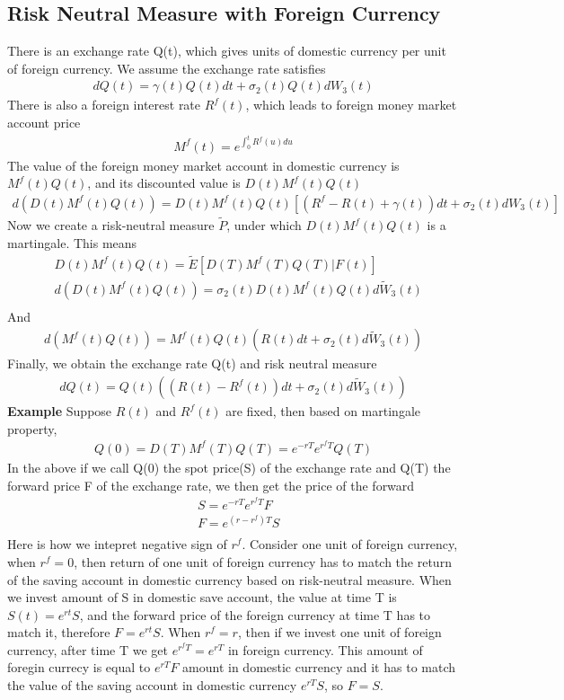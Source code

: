 \documentclass[a4paper]{article}
\begin{document}
\subsection{Risk Neutral Measure with Foreign Currency}
There is an exchange rate Q(t), which gives units of domestic currency per unit of foreign currency. We assume the exchange rate satisfies
\begin{align*}
	dQ(t) = \gamma(t)Q(t)dt + \sigma_2(t)Q(t)dW_3(t)
\end{align*}
There is also a foreign interest rate $R^f(t)$, which leads to foreign money market account price
\begin{align*}
	M^f(t) = e^{\int_0^t R^f(u) du}
\end{align*}
The value of the foreign money market account in domestic currency is $M^f(t)Q(t)$, and its discounted value is $D(t)M^f(t)Q(t)$
\begin{align*}
	d(D(t)M^f(t)Q(t)) = D(t)M^f(t)Q(t)[(R^f - R(t) + \gamma(t))dt + \sigma_2(t) dW_3(t)]
\end{align*}
Now we create a risk-neutral measure $\tilde P$, under which $D(t)M^f(t)Q(t)$ is a martingale. This means
\begin{align*}
	& D(t)M^f(t)Q(t) = \tilde E[D(T)M^f(T)Q(T)|F(t)] \\
	& d(D(t)M^f(t)Q(t)) = \sigma_2(t) D(t)M^f(t)Q(t)d\tilde W_3(t) \\
\end{align*}
And
\begin{align*}
	d(M^f(t)Q(t)) = M^f(t)Q(t)(R(t)dt + \sigma_2(t) d\tilde W_3(t))
\end{align*}
Finally, we obtain the exchange rate Q(t) and risk neutral measure
\begin{align*}
	dQ(t) = Q(t)((R(t) - R^f(t))dt + \sigma_2(t) d\tilde W_3(t))
\end{align*}
{\bf Example}
Suppose $R(t)$ and $R^f(t)$ are fixed, then based on martingale property, 
\begin{align*}
	Q(0) = D(T) M^f(T)Q(T) = e^{-rT} e^{r^fT}Q(T)
\end{align*}
In the above if we call Q(0) the spot price(S) of the exchange rate and Q(T) the forward price F of the exchange rate, we then get the price of the forward
\begin{align*}
	& S = e^{-rT} e^{r^fT}F \\
	& F = e^{(r - r^f)T}S \\
\end{align*}
Here is how we intepret negative sign of $r^f$. Consider one unit of foreign currency, when $r^f = 0$, then return of one unit of foreign currency has to match the return of the saving account in domestic currency based on risk-neutral measure. When we invest amount of S in domestic save account, the value at time T is $S(t) = e^{rt}S$, and the forward price of the foreign currency at time T has to match it, therefore $F = e^{rt} S$. When $r^f = r$, then if we invest one unit of foreign currency, after time T we get $e^{r^fT} = e^{rT}$ in foreign currency. This amount of foregin currecy is equal to $e^{rT}F$ amount in domestic currency and it has to match the value of the saving account in domestic currency $e^{rT}S$, so $F = S$.
\end{document}
